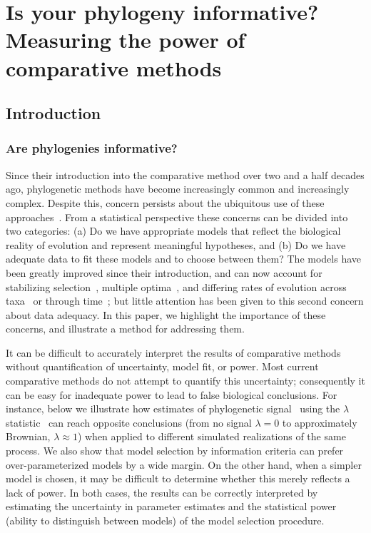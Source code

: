 

\chapter{Is your phylogeny informative? \\Measuring the power of comparative methods}\label{pmc}

\section{Introduction}
\subsection{Are phylogenies informative?}
Since their introduction into the comparative method over two and a half decades ago,
phylogenetic methods have become increasingly common and increasingly complex.
Despite this, concern persists about the ubiquitous use of these approaches~\citep{Price1997,Losos2011c}.  
From a statistical perspective these concerns can be divided into two categories: 
(a) Do we have appropriate models that reflect the biological reality of evolution and represent meaningful hypotheses, and 
(b) Do we have adequate data to fit these models and to choose between them?
The models have been greatly improved since their introduction, 
and can now account for stabilizing selection~\citep{Hansen1996}, multiple optima~\citep{Butler2004}, 
and differing rates of evolution across taxa~\citep{O'Meara2006} 
or through time~\citep{Pagel1999, Blomberg2003};
but little attention has been given to this second concern about data adequacy.
In this paper, we highlight the importance of these concerns, and illustrate a method for addressing them.  



It can be difficult to accurately interpret the results of comparative methods
without quantification of uncertainty, model fit, or power. 
Most current comparative methods do not attempt to quantify this uncertainty;
consequently it can be easy for inadequate power to lead to false biological conclusions.
For instance, below 
we illustrate how estimates of phylogenetic signal~\citep{Gittleman1990} using the $\lambda$ statistic~\citep{Pagel1999, Revell2010} 
can reach opposite conclusions (from no signal $\lambda = 0$ to approximately Brownian, $\lambda \approx 1$) 
when applied to different simulated realizations of the same process.
We also show that model selection by information criteria can prefer over-parameterized models by a wide margin.  
On the other hand, when a simpler model is chosen,
it may be difficult to determine whether this merely reflects a lack of power.  
In both cases, the results can be correctly interpreted by estimating the uncertainty in parameter estimates
and the statistical power (ability to distinguish between models) of the model selection procedure.

